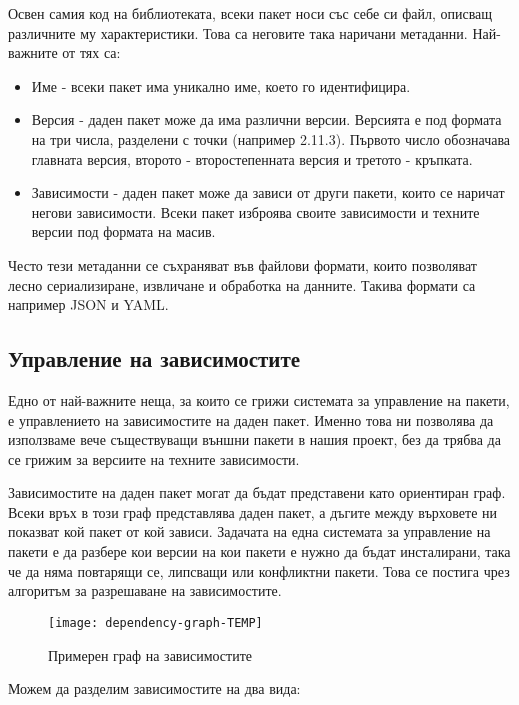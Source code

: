 Освен самия код на библиотеката, всеки пакет носи със себе си файл, описващ
различните му характеристики. Това са неговите така наричани метаданни.
Най-важните от тях са:

\begin{itemize}
    \item Име - всеки пакет има уникално име, което го идентифицира.
    \item Версия \cite{semver} - даден пакет може да има различни версии.
          Версията е под формата на три числа, разделени с точки (например
          2.11.3). Първото число обозначава главната версия, второто -
          второстепенната версия и третото - кръпката.
    \item Зависимости - даден пакет може да зависи от други пакети, които се
          наричат негови зависимости. Всеки пакет изброява своите зависимости и
          техните версии под формата на масив.
\end{itemize}

Често тези метаданни се съхраняват във файлови формати, които позволяват лесно
сериализиране, извличане и обработка на данните. Такива формати са например JSON
и YAML.


\subsection{Управление на зависимостите}

Едно от най-важните неща, за които се грижи системата за управление на пакети, е
управлението на зависимостите на даден пакет. Именно това ни позволява да
използваме вече съществуващи външни пакети в нашия проект, без да трябва да се
грижим за версиите на техните зависимости.

Зависимостите на даден пакет могат да бъдат представени като ориентиран граф.
Всеки връх в този граф представлява даден пакет, а дъгите между върховете ни
показват кой пакет от кой зависи. Задачата на една системата за управление на
пакети е да разбере кои версии на кои пакети е нужно да бъдат инсталирани, така
че да няма повтарящи се, липсващи или конфликтни пакети. Това се постига чрез
алгоритъм за разрешаване на зависимостите.

\begin{figure}[h]
    \centering
    \texttt{[image: dependency-graph-TEMP]}
    \caption{Примерен граф на зависимостите}
\end{figure}

Можем да разделим зависимостите на два вида:


